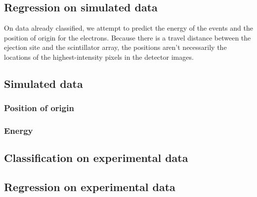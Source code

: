  
\subsection{Regression on simulated data}
On data already classified, we attempt to predict the energy of the events and the position of origin for
the electrons. Because there is a travel distance between the ejection site and the scintillator array,
the positions aren't necessarily the locations of the highest-intensity pixels in the detector images.
\subsection{Simulated data}
\subsubsection{Position of origin}

\subsubsection{Energy}


\subsection{Classification on experimental data}


\subsection{Regression on experimental data}

